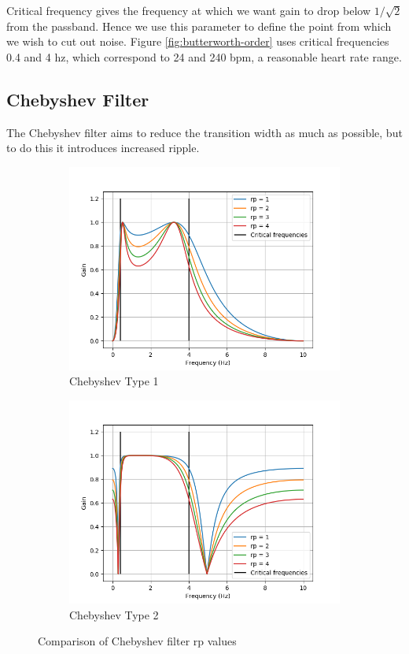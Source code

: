 \documentclass[12pt,a4paper,twoside,openright]{report}
\begin{document}
Critical frequency gives the frequency at which we want gain to drop below
\(1/\sqrt2\) from the passband. Hence we use this parameter to define the
point from which we wish to cut out noise. Figure \ref{fig:butterworth-order}
uses critical frequencies 0.4 and 4 hz, which correspond to 24 and 240 bpm, a
reasonable heart rate range.

\subsection{Chebyshev Filter}

The Chebyshev filter aims to reduce the transition width as much as possible,
but to do this it introduces increased ripple.

\begin{figure}[h]
\begin{subfigure}{.5\textwidth}
  \centering
  \includegraphics[width=\linewidth]{figs/cheby1-rp-comparison.png}
  \caption{Chebyshev Type 1}
  \label{fig:cheby1rs}
\end{subfigure}%
\begin{subfigure}{.5\textwidth}
  \centering
  \includegraphics[width=\linewidth]{figs/cheby2-rp-comparison.png}
  \caption{Chebyshev Type 2}
  \label{fig:cheby2rs}
\end{subfigure}
\caption{Comparison of Chebyshev filter rp values}
\label{fig:chebyrp}
\end{figure}
\end{document}
